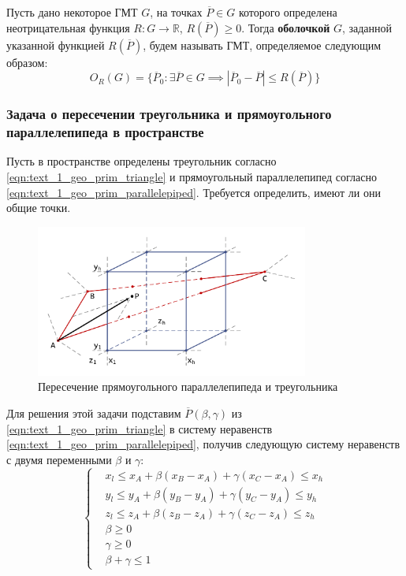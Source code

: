 \begin{definition}
Пусть дано некоторое ГМТ $G$, на точках $\overline{P} \in G$ которого определена неотрицательная функция $R: G \rightarrow \mathbb{R}$, $R(\overline{P}) \ge 0$.
Тогда \textbf{оболочкой}\label{term:envelope} $G$, заданной указанной функцией $R(\overline{P})$, будем называть ГМТ, определяемое следующим образом:
\begin{equation}
	O_R(G) = \{ \overline{P}_0: \exists \overline{P} \in G \implies |\overline{P}_0 - \overline{P}| \le R(\overline{P}) \}
\end{equation}
\end{definition}

\subsubsection{Задача о пересечении треугольника и прямоугольного параллелепипеда в пространстве}

Пусть в пространстве определены треугольник согласно \eqref{eqn:text_1_geo_prim_triangle} и прямоугольный параллелепипед согласно \eqref{eqn:text_1_geo_prim_parallelepiped}.
Требуется определить, имеют ли они общие точки.

\begin{figure}[ht]
	\centering
		\includegraphics[width=0.80\textwidth]{./pics/text_1_geo_prim/tri_block_intersect.pdf}
	\caption{Пересечение прямоугольного параллелепипеда и треугольника}
	\label{fig:text_1_geo_prim_tri_block_intersect}
\end{figure}

Для решения этой задачи подставим $\overline{P}(\beta, \gamma)$ из \eqref{eqn:text_1_geo_prim_triangle} в систему неравенств \eqref{eqn:text_1_geo_prim_parallelepiped}, получив следующую систему неравенств с двумя переменными $\beta$ и $\gamma$:
\begin{equation}\label{eqn:text_1_geo_prim_1}
	\left\{
		\begin{aligned}
			& x_l \le x_A + \beta (x_B - x_A) + \gamma (x_C - x_A) \le x_h \\
			& y_l \le y_A + \beta (y_B - y_A) + \gamma (y_C - y_A) \le y_h \\
			& z_l \le z_A + \beta (z_B - z_A) + \gamma (z_C - z_A) \le z_h \\
			& \beta \ge 0 \\
			& \gamma \ge 0 \\
			& \beta + \gamma \le 1
		\end{aligned}
	\right.
\end{equation}

